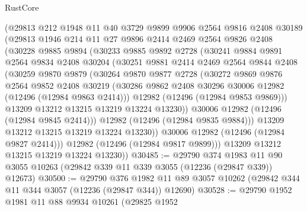 \begin{lexlean}{RustCore}
\begin{coremodule}
        (@29813
          @212
          @1948
          @11
          @40
          @3729
          @9899
          @9906
          @2564
          @9816
          @2408
          @30189
          (@29813
            @1946
            @214
            @11
            @27
            @9896
            @2414
            @2469
            @2564
            @9826
            @2408
            (@30228
              @9885
              @9894
              (@30233
                @9885
                @9892
                @2728
                (@30241
                  @9884
                  @9891
                  @2564
                  @9834
                  @2408
                  @30204
                  (@30251
                    @9881
                    @2414
                    @2469
                    @2564
                    @9844
                    @2408
                    (@30259
                      @9870
                      @9879
                      (@30264
                        @9870
                        @9877
                        @2728
                        (@30272
                          @9869
                          @9876
                          @2564
                          @9852
                          @2408
                          @30219
                          (@30286 @9862 @2408 @30296 @30006 @12982 (@12496 (@12984 @9863 @2414)))
                          @12982
                          (@12496 (@12984 @9853 @9869)))
                        @13209
                        @13212
                        @13215
                        @13219
                        @13224
                        @13230))
                    @30006
                    @12982
                    (@12496 (@12984 @9845 @2414)))
                  @12982
                  (@12496 (@12984 @9835 @9884)))
                @13209
                @13212
                @13215
                @13219
                @13224
                @13230))
            @30006
            @12982
            (@12496 (@12984 @9827 @2414)))
          @12982
          (@12496 (@12984 @9817 @9899)))
        @13209
        @13212
        @13215
        @13219
        @13224
        @13230))
@30485 := @29790
    @374
    @1983
    @11
    @90
    @3055
    @10263
    (@29842 @339 @11 @339 @3055 (@12236 (@29847 @339)) @12673)
@30500 := @29790
    @376
    @1982
    @11
    @89
    @3057
    @10262
    (@29842 @344 @11 @344 @3057 (@12236 (@29847 @344)) @12690)
@30528 := @29790
    @1952
    @1981
    @11
    @88
    @9934
    @10261
    (@29825
      @1952

\end{coremodule}
\end{lexlean}

